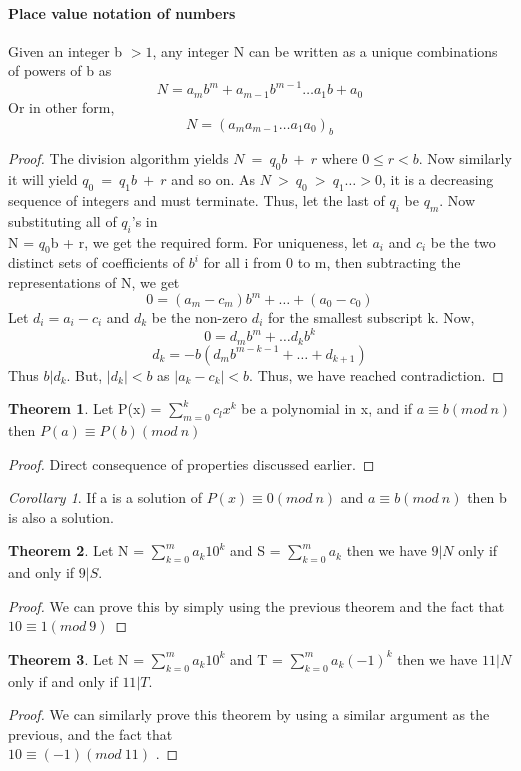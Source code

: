 \documentclass[15,a4paper]{report}
\theoremstyle{definition}
\newtheorem{theorem}{Theorem}[section]
\theoremstyle{remark}
\newtheorem{corollary}{Corollary}[theorem]
\begin{document}
        \paragraph{Place value notation of numbers} 
            Given an integer b $>1$, any integer N can be written as a unique combinations of powers of b as \[ N = a_m b^m + a_{m-1} b^{m-1} \dots a_1 b + a_0\]
            Or in other form, \[ N = (a_m a_{m-1} \dots a_1 a_0)_b \]
            \begin{proof}
                The division algorithm yields $ N ~=~ q_0 b ~+~ r$ where $0\leq r <b$. Now similarly it will yield $q_0 ~=~ q_1 b ~+~ r$ and so on. As $N ~>~ q_0 ~>~ q_1 \dots  >0$, it is a decreasing sequence of integers and must terminate. Thus, let the last of $q_i$ be $q_m$. Now substituting all of $q_i$'s in\\ N = $q_0$b + r, we get the required form. 
                For uniqueness, let $a_i$ and $c_i$ be the two distinct sets of coefficients of $b^i$ for all i from 0 to m, then subtracting the representations of N, we get \[ 0 = (a_m - c_m)b^m + \dots + (a_0 - c_0) \]
                Let $d_i = a_i - c_i$ and $d_k $ be the non-zero $d_i$ for the smallest subscript k. Now, \[ 0 = d_m b^m + \dots d_k b^k\]
                \[ d_k = -b(d_m b^{m-k-1} + \dots + d_{k+1} )\]
                Thus $b|d_k$. But, $|d_k| <b$ as $|a_k - c_k| < b$. Thus, we have reached contradiction.
            \end{proof}
        \begin{theorem}
            Let P(x) = $\sum_{m=0}^{k} c_l x^k$ be a polynomial in x, and if $a\equiv b(mod ~n)$ then $P(a)\equiv P(b)(mod ~n)$
        \end{theorem}    
            \begin{proof}
                Direct consequence of properties discussed earlier.
            \end{proof}
            \begin{corollary}
                If a is a solution of $P(x) \equiv 0 (mod ~n)$ and $a\equiv b(mod ~n)$ then b is also a solution.
            \end{corollary}
        \begin{theorem}
            Let N = $\sum_{k=0}^{m} a_k 10^k$ and S = $\sum_{k=0}^{m} a_k$ then we have $9|N$ only if and only if $9|S$.
        \end{theorem}    
            \begin{proof}
                We can prove this by simply using the previous theorem and the fact that $10\equiv 1(mod ~9)$
            \end{proof}
        \begin{theorem}
            Let N = $\sum_{k=0}^{m} a_k 10^k$ and T = $\sum_{k=0}^{m} a_k(-1)^k$ then we have $11|N$ only if and only if $11|T$.
        \end{theorem}    
            \begin{proof}
                We can similarly prove this theorem by using a similar argument as the previous, and the fact that \\ $ 10 \equiv (-1) (mod ~11) $ .
            \end{proof}
\end{document}
